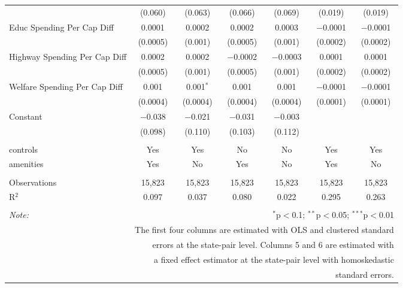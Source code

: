 \begin{table}[!htbp]
\begin{tabular}{@{\extracolsep{5pt}}lcccccc}
  & (0.060) & (0.063) & (0.066) & (0.069) & (0.019) & (0.019) \\ 
  Educ Spending Per Cap Diff & 0.0001 & 0.0002 & 0.0002 & 0.0003 & $-$0.0001 & $-$0.0001 \\ 
  & (0.0005) & (0.001) & (0.0005) & (0.001) & (0.0002) & (0.0002) \\ 
  Highway Spending Per Cap Diff & 0.0002 & 0.0002 & $-$0.0002 & $-$0.0003 & 0.0001 & 0.0001 \\ 
  & (0.0005) & (0.001) & (0.0005) & (0.001) & (0.0002) & (0.0002) \\ 
  Welfare Spending Per Cap Diff & 0.001 & 0.001$^{*}$ & 0.001 & 0.001 & $-$0.0001 & $-$0.0001 \\ 
  & (0.0004) & (0.0004) & (0.0004) & (0.0004) & (0.0001) & (0.0001) \\ 
  Constant & $-$0.038 & $-$0.021 & $-$0.031 & $-$0.003 &  &  \\ 
  & (0.098) & (0.110) & (0.103) & (0.112) &  &  \\ 
 \hline \\[-1.8ex] 
controls & Yes & Yes & No & No & Yes & Yes \\ 
amenities & Yes & No & Yes & No & Yes & No \\ 
\hline \\[-1.8ex] 
Observations & 15,823 & 15,823 & 15,823 & 15,823 & 15,823 & 15,823 \\ 
R$^{2}$ & 0.097 & 0.037 & 0.080 & 0.022 & 0.295 & 0.263 \\ 
\hline 
\hline \\[-1.8ex] 
\textit{Note:}  & \multicolumn{6}{r}{$^{*}$p$<$0.1; $^{**}$p$<$0.05; $^{***}$p$<$0.01} \\ 
 & \multicolumn{6}{r}{The first four columns are estimated with OLS and clustered standard} \\ 
 & \multicolumn{6}{r}{ errors at the state-pair level. Columns 5 and 6 are estimated with} \\ 
 & \multicolumn{6}{r}{a fixed effect estimator at the state-pair level with homoskedastic} \\ 
 & \multicolumn{6}{r}{standard errors.} \\ 
\end{tabular} 
\end{table} 
